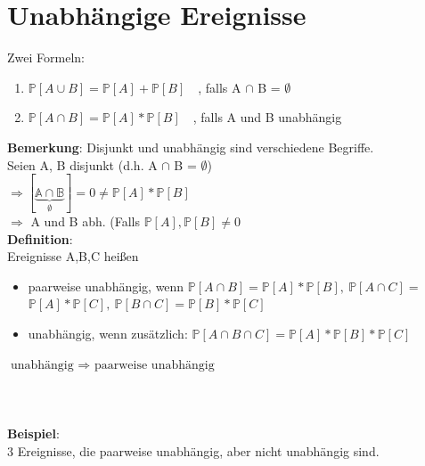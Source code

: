 \section{Unabhängige Ereignisse}
Zwei Formeln:
\begin{enumerate}
	\item $\mathds{P}[A\cup B] = \mathds{P}[A]+\mathds{P}[B] \quad$, falls A $\cap$ B = $\emptyset$
	\item $\mathds{P}[A\cap B] = \mathds{P}[A]*\mathds{P}[B] \quad$, falls A und B unabhängig
\end{enumerate}
\textbf{Bemerkung}: Disjunkt und unabhängig sind verschiedene Begriffe.\smallskip\\
Seien A, B disjunkt (d.h. A $\cap$ B = $\emptyset$)\medskip\\ $\Rightarrow \mathds{[\underbrace{A \cap B}_\emptyset]}= 0 \neq \mathds{P}[A]*\mathds{P}[B]$\smallskip\\$\Rightarrow$ A und B abh. (Falls $\mathds{P}[A], \mathds{P}[B] \neq 0$\medskip\\
\textbf{Definition}:\\
Ereignisse A,B,C heißen
\begin{itemize}
	\item paarweise unabhängig, wenn $\mathds{P}[A\cap B] = \mathds{P}[A]*\mathds{P}[B],\: \mathds{P}[A\cap C] =$\\$ \mathds{P}[A]*\mathds{P}[C],\:\mathds{P}[B \cap C]=\mathds{P}[B]*\mathds{P}[C]$
	\item unabhängig, wenn zusätzlich: $\mathds{P}[A\cap B \cap C] = \mathds{P}[A]*\mathds{P}[B]*\mathds{P}[C]$
\end{itemize}
$\text{unabhängig } \Rightarrow \text{ paarweise unabhängig}$\\\\\\\\
\textbf{Beispiel}:\\
3 Ereignisse, die paarweise unabhängig, aber nicht unabhängig sind.\smallskip\\

